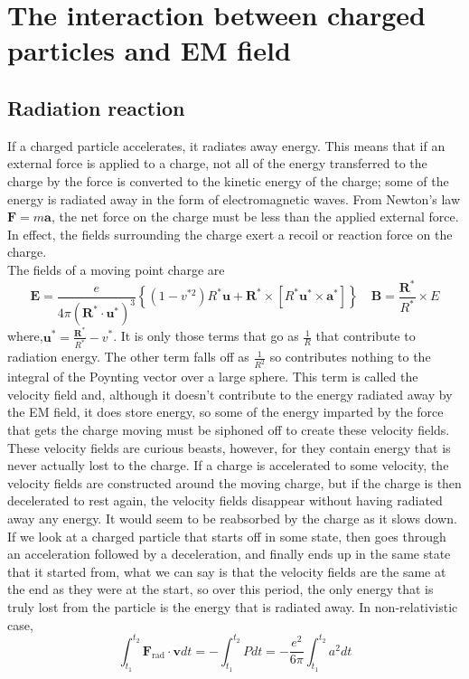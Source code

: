 \section{The interaction between charged particles and EM field}
\subsection{Radiation reaction}
If a charged particle accelerates, it radiates away energy. This means that if an external force is applied to a charge, not all of the energy transferred to the charge by the force is converted to the kinetic energy of the charge; some of the energy is radiated away in the form of electromagnetic waves.  From Newton's law $\bm{F}=m\bm{a}$, the net force on the charge must be less than the applied external force. In effect, the fields surrounding the charge exert a recoil or reaction force on the charge.\\
The fields of a moving point charge are
\[\bm{E} = \frac{e}{4\pi(\bm{R}^*\cdot\bm{u}^*)^3}\left\{(1-v^{*2})R^*\bm{u} + \bm{R}^* \times [R^*\bm{u}^* \times \bm{a}^*]\right\} \quad \bm{B} = \frac{\bm{R}^*}{R^*}\times E\]
where,$\bm{u}^* = \frac{\bm{R}^*}{R^*}-v^*$.
It is only those terms that go as $\frac{1}{R}$ that contribute to radiation energy. The other term falls off as $\frac{1}{R^2}$ so contributes nothing to the integral of the Poynting vector over a large sphere. This term is called the velocity field and, although it doesn't contribute to the energy radiated away by the EM field, it does store energy, so some of the energy imparted by the force that gets the charge moving must be siphoned off to create these velocity fields. These velocity fields are curious beasts, however, for they contain energy that is never actually lost to the charge. If a charge is accelerated to some velocity, the velocity fields are constructed around the moving charge, but if the charge is then decelerated to rest again, the velocity fields disappear without having radiated away any energy. It would seem to be reabsorbed by the charge as it slows down. \\
If we look at a charged particle that starts off in some state, then goes through an acceleration followed by a deceleration, and finally ends up in the same state that it started from, what we can say is that the velocity fields are the same at the end as they were at the start, so over this period, the only energy that is truly lost from the particle is the energy that is radiated away. In non-relativistic case,
\[\int_{t_{1}}^{t_{2}}\bm{F}_{\mathrm{rad}}\cdot\bm{v}dt = -\int_{t_{1}}^{t_{2}}Pdt = -\frac{e^{2}}{6\pi }\int_{t_{1}}^{t_{2}}a^{2}dt \]

